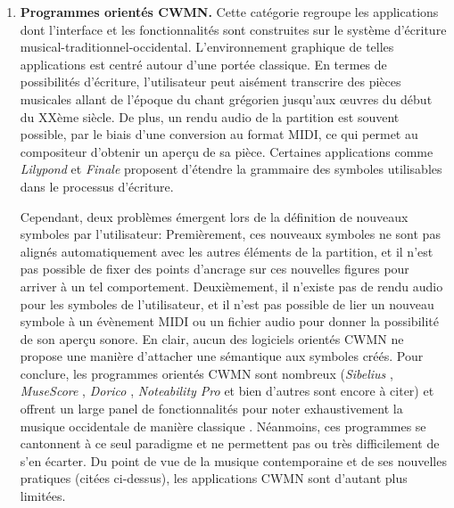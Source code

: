 \begin{enumerate}[label=(\arabic*)]
	\item \textbf{Programmes orientés CWMN.} Cette catégorie regroupe les applications dont l'interface et les fonctionnalités sont construites sur le système d'écriture musical-traditionnel-occidental. L'environnement graphique de telles applications est centré autour d'une portée classique. En termes de possibilités d'écriture, l'utilisateur peut aisément transcrire des pièces musicales allant de l'époque du chant grégorien jusqu'aux œuvres du début du XXème siècle. De plus, un rendu audio de la partition est souvent possible, par le biais d'une conversion au format MIDI, ce qui permet au compositeur d'obtenir un aperçu de sa pièce. Certaines applications comme \textit{Lilypond} \cite{lilypond2018} et \textit{Finale} \cite{finale2018} proposent d'étendre la grammaire des symboles utilisables dans le processus d'écriture. 
	
	Cependant, deux problèmes émergent lors de la définition de nouveaux symboles par l'utilisateur: Premièrement, ces nouveaux symboles ne sont pas alignés automatiquement avec les autres éléments de la partition, et il n'est pas possible de fixer des points d'ancrage sur ces nouvelles figures pour arriver à un tel comportement. Deuxièmement, il n'existe pas de rendu audio pour les symboles de l'utilisateur, et il n'est pas possible de lier un nouveau symbole à un évènement MIDI ou un fichier audio pour donner la possibilité de son aperçu sonore. En clair, aucun des logiciels orientés CWMN ne propose une manière d'attacher une sémantique aux symboles créés.
Pour conclure, les programmes orientés CWMN sont nombreux (\textit{Sibelius} \cite{sibelius2018}, \textit{MuseScore} \cite{musescore2018}, \textit{Dorico} \cite{dorico2018}, \textit{Noteability Pro} \cite{noteAbility2018} et bien d'autres sont encore à citer) et offrent un large panel de fonctionnalités pour noter exhaustivement la musique occidentale de manière \og classique \fg.
Néanmoins, ces programmes se cantonnent à ce seul paradigme et ne permettent pas ou très difficilement de s'en écarter. Du point de vue de la musique contemporaine et de ses nouvelles pratiques (citées ci-dessus), les applications CWMN sont d'autant plus limitées. 
  

\end{enumerate}
